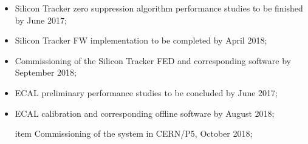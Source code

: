 \begin{itemize}
\item Silicon Tracker zero suppression algorithm performance studies to be finished by June 2017; 

\item Silicon Tracker FW implementation to be completed by April 2018; 

\item Commissioning of the Silicon Tracker FED and corresponding software by September 2018; 

\item ECAL preliminary performance studies to be concluded by June 2017;
 
\item ECAL calibration and corresponding offline software by August 2018;  \

item Commissioning of the system in CERN/P5, October 2018;
\end{itemize}

